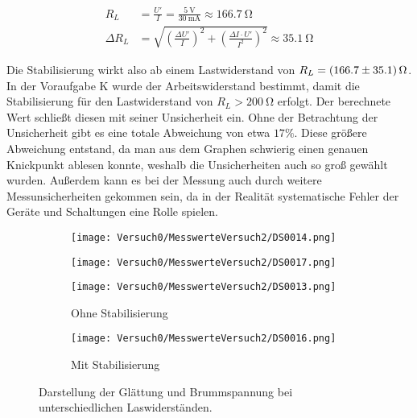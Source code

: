\documentclass{article}
\begin{document}
\begin{align}
    R_L &= \frac{U'}{I} = \frac{\SI{5}{\volt}}{\SI{30}{\milli \ampere}} \approx \SI{166.7}{\ohm} \\
    \Delta R_L &= \sqrt{\left( \frac{\Delta U'}{I}\right)^2 + \left( \frac{\Delta I \cdot U'}{I^2}\right)^2} \approx \SI{35.1}{\ohm}
\end{align}


Die Stabilisierung wirkt also ab einem Lastwiderstand von $R_L = \SI{166.7\pm 35.1}{\ohm}$. In der Voraufgabe K wurde der Arbeitswiderstand bestimmt, damit die Stabilisierung für den Lastwiderstand von $R_L > \SI{200}{\ohm}$ erfolgt. Der berechnete Wert schließt diesen mit seiner Unsicherheit ein. Ohne der Betrachtung der Unsicherheit gibt es eine totale Abweichung von etwa $17\%$. Diese größere Abweichung entstand, da man aus dem Graphen schwierig einen genauen Knickpunkt ablesen konnte, weshalb die Unsicherheiten auch so groß gewählt wurden. Außerdem kann es bei der Messung auch durch weitere Messunsicherheiten gekommen sein, da in der Realität systematische Fehler der Geräte und Schaltungen eine Rolle spielen.


\begin{figure}[h!]
    \centering
    \begin{subfigure}[b]{0.45\textwidth}
        \texttt{[image: Versuch0/MesswerteVersuch2/DS0014.png]}
    \end{subfigure}
    \hfill
    \begin{subfigure}[b]{0.45\textwidth}
        \texttt{[image: Versuch0/MesswerteVersuch2/DS0017.png]}
      
    \end{subfigure}

    \vspace{0.5cm} %

    \begin{subfigure}[b]{0.45\textwidth}
        \texttt{[image: Versuch0/MesswerteVersuch2/DS0013.png]}
          \caption{Ohne Stabilisierung}
    \end{subfigure}
    \hfill
    \begin{subfigure}[b]{0.45\textwidth}
        \texttt{[image: Versuch0/MesswerteVersuch2/DS0016.png]}
        \caption{Mit Stabilisierung}
    \end{subfigure}


    \caption{Darstellung der Glättung und Brummspannung bei unterschiedlichen Laswiderständen.}
    \label{fig:StabBrumm}
\end{figure}
\end{document}
